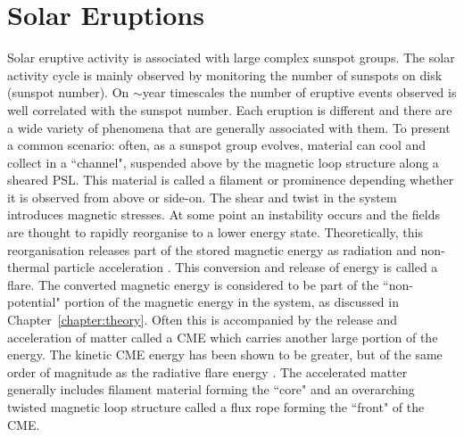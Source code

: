 

\section{Solar Eruptions}\label{intro:solerupt}

Solar eruptive activity is associated with large complex sunspot groups. The solar activity cycle is mainly observed by monitoring the number of sunspots on disk (sunspot number). On $\sim$year timescales the number of eruptive events observed is well correlated with the sunspot number. Each eruption is different and there are a wide variety of phenomena that are generally associated with them. To present a common scenario: often, as a sunspot group evolves, material can cool and collect in a ``channel", suspended above by the magnetic loop structure along a sheared \gls{PSL}. This material is called a filament or prominence depending whether it is observed from above or side-on. The shear and twist in the system introduces magnetic stresses. At some point an instability occurs and the fields are thought to rapidly reorganise to a lower energy state. Theoretically, this reorganisation releases part of the stored magnetic energy as radiation and non-thermal particle acceleration \citep{Fletcher:2011}. This conversion and release of energy is called a flare. The converted magnetic energy is considered to be part of the ``non-potential" portion of the magnetic energy in the system, as discussed in Chapter~\ref{chapter:theory}. Often this is accompanied by the release and acceleration of matter called a \gls{CME} which carries another large portion of the energy. The kinetic \gls{CME} energy has been shown to be greater, but of the same order of magnitude as the radiative flare energy \citep{Emslie:2004}. The accelerated matter generally includes filament material forming the ``core" and an overarching twisted magnetic loop structure called a flux rope forming the ``front" of the \gls{CME}. 

